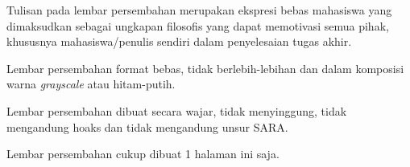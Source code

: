 
\begin{center}
Tulisan pada lembar persembahan merupakan ekspresi bebas mahasiswa yang dimaksudkan sebagai ungkapan filosofis yang dapat memotivasi semua pihak, khususnya mahasiswa/penulis sendiri dalam penyelesaian tugas akhir.

Lembar persembahan format bebas, tidak berlebih-lebihan dan dalam komposisi warna \textit{grayscale} atau hitam-putih.

Lembar persembahan dibuat secara wajar, tidak menyinggung, tidak mengandung hoaks dan tidak mengandung unsur SARA.

Lembar persembahan cukup dibuat 1 halaman ini saja.
\end{center}
